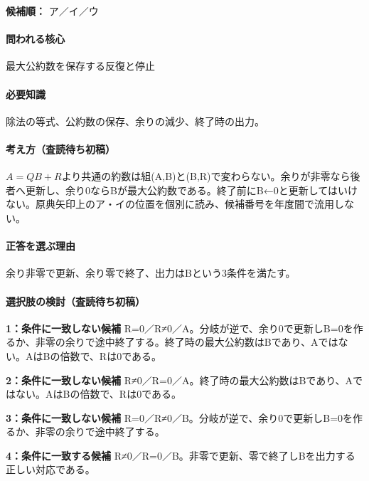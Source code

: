 \noindent\textbf{候補順：} ア／イ／ウ\par

\paragraph{問われる核心} 最大公約数を保存する反復と停止

\paragraph{必要知識} 除法の等式、公約数の保存、余りの減少、終了時の出力。

\paragraph{考え方（査読待ち初稿）} \(A=QB+R\)より共通の約数は組(A,B)と(B,R)で変わらない。余りが非零なら後者へ更新し、余り0ならBが最大公約数である。終了前にB←0と更新してはいけない。原典矢印上のア・イの位置を個別に読み、候補番号を年度間で流用しない。

\paragraph{正答を選ぶ理由} 余り非零で更新、余り零で終了、出力はBという3条件を満たす。

\paragraph{選択肢の検討（査読待ち初稿）}\mbox{}\par

\noindent\textbf{1：条件に一致しない候補} R=\allowbreak{}0／R≠0／A。分岐が逆で、余り0で更新しB=\allowbreak{}0を作るか、非零の余りで途中終了する。終了時の最大公約数はBであり、Aではない。AはBの倍数で、Rは0である。\par

\noindent\textbf{2：条件に一致しない候補} R≠0／R=\allowbreak{}0／A。終了時の最大公約数はBであり、Aではない。AはBの倍数で、Rは0である。\par

\noindent\textbf{3：条件に一致しない候補} R=\allowbreak{}0／R≠0／B。分岐が逆で、余り0で更新しB=\allowbreak{}0を作るか、非零の余りで途中終了する。\par

\noindent\textbf{4：条件に一致する候補} R≠0／R=\allowbreak{}0／B。非零で更新、零で終了しBを出力する正しい対応である。\par

